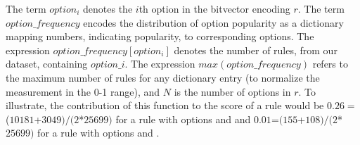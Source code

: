\documentclass[conference]{IEEEtran}
\begin{document}



\noindent
The term $\mathit{option_i}$ denotes the $i$th option in the bitvector
encoding $r$. The term $\mathit{option\_frequency}$ encodes the
distribution of option popularity as a dictionary mapping numbers,
indicating popularity, to corresponding options. The expression
$\mathit{option\_frequency[option_i]}$ denotes the number of rules,
from our dataset, containing $\mathit{option\_i}$. The expression
$\mathit{max(option\_frequency)}$ refers to the maximum number of
rules for any dictionary entry (to normalize the measurement in the
0-1 range), and $N$ is the number of options in $r$. To illustrate,
the contribution of this function to the score of a rule would be
$0.26=$($10181$+$3049)/(2$*$25699)$ for a rule with options
 and  and
$0.01$=$(155$+$108)/(2$*$25699)$ for a rule with options
 and .



\end{document}
